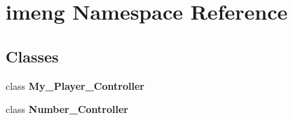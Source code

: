 \section{imeng Namespace Reference}
\label{namespaceimeng}
\subsection*{Classes}
\begin{DoxyCompactItemize}
\item 
class \textbf{ My\+\_\+\+Player\+\_\+\+Controller}
\item 
class \textbf{ Number\+\_\+\+Controller}
\end{DoxyCompactItemize}
